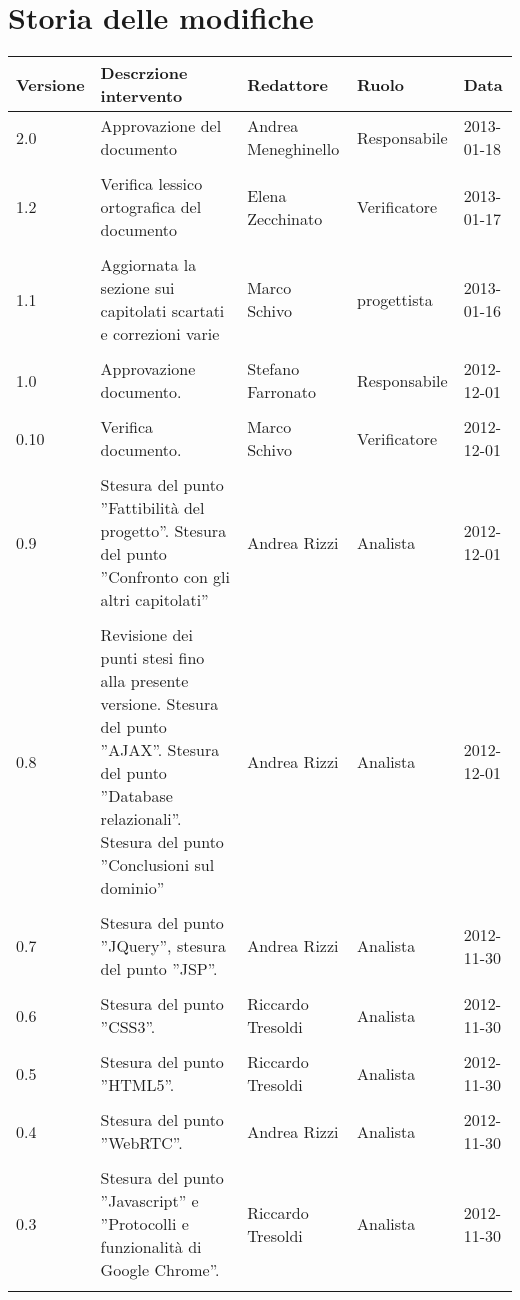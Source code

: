 \section*{Storia delle modifiche}
\begin{longtable}{lp{}lll}
\toprule
Versione & Descrzione intervento & Redattore & Ruolo & Data\\
\midrule %

2.0 & Approvazione del documento & Andrea Meneghinello &Responsabile& 2013-01-18\\\\
1.2 & Verifica lessico ortografica del documento & Elena Zecchinato &Verificatore& 2013-01-17\\\\
1.1 & Aggiornata la sezione sui capitolati scartati e correzioni varie & Marco Schivo &progettista& 2013-01-16\\\\
1.0 & Approvazione documento. & Stefano Farronato &Responsabile& 2012-12-01\\\\
0.10 & Verifica documento. & Marco Schivo &Verificatore& 2012-12-01\\\\
0.9 & Stesura del punto ''Fattibilità del progetto''. Stesura del punto ''Confronto con gli altri capitolati'' & Andrea Rizzi &Analista& 2012-12-01\\\\
0.8 & Revisione dei punti stesi fino alla presente versione. Stesura del punto ''AJAX''. Stesura del punto ''Database relazionali''. Stesura del punto ''Conclusioni sul dominio'' & Andrea Rizzi &Analista& 2012-12-01\\\\
0.7 & Stesura del punto ''JQuery'', stesura del punto ''JSP''. & Andrea Rizzi &Analista& 2012-11-30\\\\
0.6 & Stesura del punto ''CSS3''. & Riccardo Tresoldi &Analista& 2012-11-30\\\\
0.5 & Stesura del punto ''HTML5''. & Riccardo Tresoldi&Analista& 2012-11-30\\\\
0.4 & Stesura del punto ''WebRTC''. & Andrea Rizzi &Analista& 2012-11-30\\\\
0.3 & Stesura del punto ''Javascript'' e ''Protocolli e funzionalità di Google Chrome''.  & Riccardo Tresoldi &Analista& 2012-11-30\\\\

\end{longtable}
